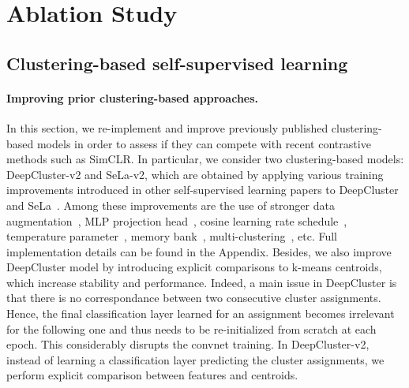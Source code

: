 \documentclass{article}
\newcommand{\appendixName}{Appendix}
\begin{document}
\section{Ablation Study}
\label{sec:ablation}

\subsection{Clustering-based self-supervised learning}

\paragraph{Improving prior clustering-based approaches.}
In this section, we re-implement and improve previously published clustering-based models in order to assess if they can compete with recent contrastive methods such as SimCLR.
In particular, we consider two clustering-based models: DeepCluster-v2 and SeLa-v2, which are obtained by applying various training improvements introduced in other self-supervised learning papers to DeepCluster~\cite{caron2018deep} and SeLa~\cite{asano2019self}.
Among these improvements are the use of stronger data augmentation~\cite{chen2020simple}, MLP projection head~\cite{chen2020simple}, cosine learning rate schedule~\cite{misra2019self}, temperature parameter~\cite{wu2018unsupervised}, memory bank~\cite{wu2018unsupervised}, multi-clustering~\cite{asano2019self}, etc.
Full implementation details can be found in the \appendixName.
Besides, we also improve DeepCluster model by introducing explicit comparisons to k-means centroids, which increase stability and performance.
Indeed, a main issue in DeepCluster is that there is no correspondance between two consecutive cluster assignments.
Hence, the final classification layer learned for an assignment becomes irrelevant for the following one and thus needs to be re-initialized from scratch at each epoch.
This considerably disrupts the convnet training.
In DeepCluster-v2, instead of learning a classification layer predicting the cluster assignments, we perform explicit comparison between features and centroids.
\end{document}
